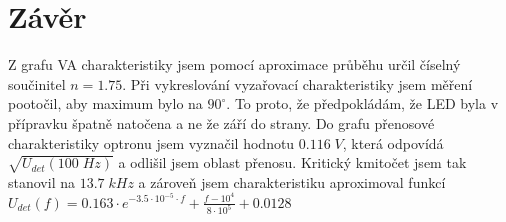\documentclass{article}
\begin{document}
\section{Závěr}
Z grafu VA charakteristiky jsem pomocí aproximace průběhu určil číselný součinitel \(n = 1.75\).
Při vykreslování vyzařovací charakteristiky jsem měření pootočil, aby maximum bylo na \(90^\circ\).
To proto, že předpokládám, že LED byla v přípravku špatně natočena a ne že září do strany.
Do grafu přenosové charakteristiky optronu jsem vyznačil hodnotu \(0.116\;V\), která odpovídá \(\sqrt{U_{det}(100\;Hz)}\) a odlišil jsem oblast přenosu.
Kritický kmitočet jsem tak stanovil na \(13.7\;kHz\) a zároveň jsem charakteristiku aproximoval funkcí \(U_{det}(f)=0.163\cdot e^{-3.5\cdot10^{-5}\cdot f}+\frac{f-10^4}{8\cdot10^5}+0.0128\)
\end{document}
